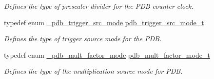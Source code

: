 \begin{DoxyCompactItemize}
\begin{DoxyCompactList}\small\item\em Defines the type of prescaler divider for the P\+DB counter clock. \end{DoxyCompactList}\item 
typedef enum \hyperlink{group__pdb__hal_ga436ffb28ac0668778b62d7e380815cb9}{\+\_\+pdb\+\_\+trigger\+\_\+src\+\_\+mode} \hyperlink{group__pdb__hal_ga309bd99814bc35b81b79d08340d23258}{pdb\+\_\+trigger\+\_\+src\+\_\+mode\+\_\+t}
\begin{DoxyCompactList}\small\item\em Defines the type of trigger source mode for the P\+DB. \end{DoxyCompactList}\item 
typedef enum \hyperlink{group__pdb__hal_gae87b5a0cf111784453bd0090c1a05254}{\+\_\+pdb\+\_\+mult\+\_\+factor\+\_\+mode} \hyperlink{group__pdb__hal_ga26a3aaa96982c57d4db1c4e579dc59db}{pdb\+\_\+mult\+\_\+factor\+\_\+mode\+\_\+t}
\begin{DoxyCompactList}\small\item\em Defines the type of the multiplication source mode for P\+DB. \end{DoxyCompactList}\end{DoxyCompactItemize}
